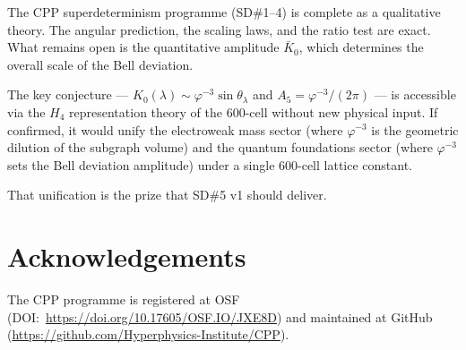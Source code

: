 \documentclass[11pt,letterpaper]{article}
\newcommand{\phig}{\varphi}
\begin{document}
The CPP superdeterminism programme (SD\#1--4) is complete as a
qualitative theory.  The angular prediction, the scaling laws,
and the ratio test are exact.  What remains open is the
quantitative amplitude $\bar K_0$, which determines the overall
scale of the Bell deviation.

The key conjecture — $K_0(\lambda) \sim \phig^{-3}\sin\theta_\lambda$
and $A_5 = \phig^{-3}/(2\pi)$ — is accessible via the $H_4$
representation theory of the 600-cell without new physical input.
If confirmed, it would unify the electroweak mass sector (where
$\phig^{-3}$ is the geometric dilution of the subgraph volume) and
the quantum foundations sector (where $\phig^{-3}$ sets the Bell
deviation amplitude) under a single 600-cell lattice constant.

That unification is the prize that SD\#5 v1 should deliver.





\section*{Acknowledgements}
The CPP programme is registered at OSF (DOI:~\url{https://doi.org/10.17605/OSF.IO/JXE8D}) and maintained at GitHub (\url{https://github.com/Hyperphysics-Institute/CPP}).
\end{document}

